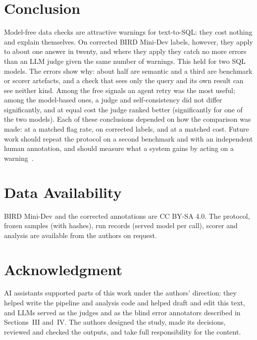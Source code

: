\documentclass[conference]{IEEEtran}
\begin{document}
\section{Conclusion}

Model-free data checks are attractive warnings for text-to-SQL: they cost nothing and explain
themselves. On corrected BIRD Mini-Dev labels, however, they apply to about one answer in twenty, and
where they apply they catch no more errors than an LLM judge given the same number of warnings. This
held for two SQL models. The errors show why: about half are semantic and a third are benchmark or
scorer artefacts, and a check that sees only the query and its own result can see neither kind. Among
the free signals an agent retry was the most useful; among the model-based ones, a judge and
self-consistency did not differ significantly, and at equal cost the judge ranked better (significantly
for one of the two models). Each of these
conclusions depended on how the comparison was made: at a matched flag rate, on corrected labels, and
at a matched cost. Future work should repeat the protocol on a second benchmark and with an
independent human annotation, and should measure what a system gains by acting on a
warning~\cite{companion2026decisions}.

\section*{Data Availability}
BIRD Mini-Dev and the corrected annotations are CC BY-SA 4.0. The protocol, frozen samples (with hashes), run
records (served model per call), scorer and analysis are available from the authors on request.

\section*{Acknowledgment}
AI assistants supported parts of this work under the authors' direction: they helped write the
pipeline and analysis code and helped draft and edit this text, and LLMs served as the judges and as the
blind error annotators described in Sections~III and~IV. The authors designed the study, made its decisions,
reviewed and checked the outputs, and take full responsibility for the content.



\end{document}
